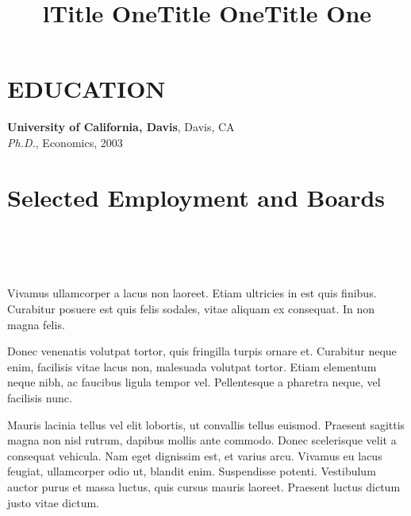 \documentclass[margin]{res}
\begin{document}
\begin{resume}

\section{EDUCATION}
\textbf{University of California, Davis}, Davis, CA\\
{\sl Ph.D.}, Economics, 2003

\section{Selected Employment and Boards}

\begin{format}
\title{l}\\
\\
\body\\
\end{format}

\title{\textbf{Title One}}
\begin{position}
Vivamus ullamcorper a lacus non laoreet. Etiam ultricies in est quis finibus. 
Curabitur posuere est quis felis sodales, vitae aliquam ex consequat. In non 
magna felis.
\end{position}

\title{\textbf{Title One}}
\begin{position}
Donec venenatis volutpat tortor, quis fringilla turpis ornare et. Curabitur 
neque enim, facilisis vitae lacus non, malesuada volutpat tortor. Etiam 
elementum neque nibh, ac faucibus ligula tempor vel. Pellentesque a pharetra 
neque, vel facilisis nunc.
\end{position}

\title{\textbf{Title One}}
\begin{position}
Mauris lacinia tellus vel elit lobortis, ut convallis tellus euismod. Praesent 
sagittis magna non nisl rutrum, dapibus mollis ante commodo. Donec scelerisque 
velit a consequat vehicula. Nam eget dignissim est, et varius arcu. Vivamus eu 
lacus feugiat, ullamcorper odio ut, blandit enim. Suspendisse potenti. 
Vestibulum auctor purus et massa luctus, quis cursus mauris laoreet. Praesent 
luctus dictum justo vitae dictum.
\end{position}



\end{resume}
\end{document}
